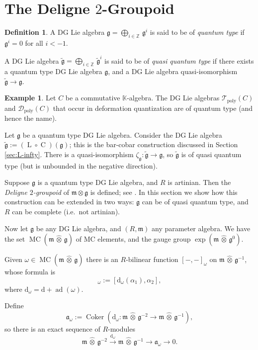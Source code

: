 \documentclass[a4paper,10pt]{amsart}
\theoremstyle{definition}
\newtheorem{dfn}[equation]{Definition}
\newtheorem{exa}[equation]{Example}
\numberwithin{equation}{section}
\newcommand{\xar}{\xrightarrow}
\newcommand{\opn}{\operatorname}
\newcommand{\mfrak}[1]{\mathfrak{#1}}
\newcommand{\mcal}[1]{\mathcal{#1}}
\newcommand{\mrm}[1]{\mathrm{#1}}
\newcommand{\mbb}[1]{\mathbb{#1}}
\newcommand{\ot}{\otimes}
\newcommand{\til}[1]{\tilde{#1}}
\newcommand{\what}[1]{\widehat{#1}}
\newcommand{\hatotimes}{\, \what{\otimes} \,}
\newcommand{\hot}{\hatotimes}
\newcommand{\K}{\mbb{K}}
\newcommand{\Z}{\mbb{Z}}
\newcommand{\g}{\mfrak{g}}
\newcommand{\m}{\mfrak{m}}
\renewcommand{\a}{\mfrak{a}}
\renewcommand{\d}{\mrm{d}}
\newcommand{\om}{\omega}
\newcommand{\al}{\alpha}
\begin{document}
\section{The Deligne $2$-Groupoid}
\label{sec:del-2-grpd}

\begin{dfn}
A DG Lie algebra $\g =  \bigoplus_{i \in \Z}\, \g^i$ is
said to be of {\em quantum type} if $\g^i = 0$ for all $i < -1$. 

A DG Lie algebra
$\til{\g} =  \bigoplus_{i \in \Z}\, \til{\g}^i$ is said to be of
{\em quasi quantum type} if there exists
a quantum type DG Lie algebra $\g$, and a DG Lie algebra quasi-isomorphism 
$\til{\g} \to \g$.
\end{dfn}

\begin{exa} \label{exa:102}
Let $C$ be a commutative $\K$-algebra. The DG Lie algebras 
$\mcal{T}_{\mrm{poly}}(C)$ and $\mcal{D}_{\mrm{poly}}(C)$
that occur in deformation quantization are of quantum type (and hence the
name). 

Let $\g$ be a quantum type DG Lie algebra. Consider the DG Lie algebra 
$\til{\g} := (\opn{L} \circ \opn{C})(\g)$;
this is the bar-cobar construction discussed in Section \ref{sec:L-infty}. 
There is a quasi-isomorphism 
$\zeta_{\g} : \til{\g} \to \g$,
so $\til{\g}$ is of quasi quantum type (but is unbounded in the negative
direction). 
\end{exa}

Suppose $\g$ is a quantum type DG Lie algebra, and $R$ is artinian. Then the 
{\em Deligne $2$-groupoid} of $\m \ot \g$ is defined; see \cite{Ge}. 
In this section we show how this construction can be extended in two ways: 
$\g$ can be of quasi quantum type, and $R$ can be complete (i.e.\ not artinian).

Now let $\g$ be any DG Lie algebra, and $(R, \m)$ any parameter algebra. We have
the set $\opn{MC}(\m \hot \g)$ of MC elements, and the gauge
group $\opn{exp}(\m \hot \g^0)$.

Given $\om \in \opn{MC}(\m \hot \g)$ there is an $R$-bilinear function 
$[-,-]_{\om}$ on $\m \hot \g^{-1}$, whose formula is 
\begin{equation}
[\al_1, \al_2]_{\om} := [ \d_{\om}(\al_1), \al_2 ] , 
\end{equation}
where $\d_{\om} = \d + \opn{ad}(\om)$.

Define  
\begin{equation}
 \a_{\om} := \opn{Coker}(\d_{\om} : \m \hot \g^{-2} \to 
\m \hot \g^{-1}) ,
\end{equation}
so there is an exact sequence of $R$-modules
\begin{equation} \label{eqn:107}
\m \hot \g^{-2} \xar{\d_{\om}} \m \hot \g^{-1} \to \a_{\om} \to 0 .
\end{equation}
\end{document}
